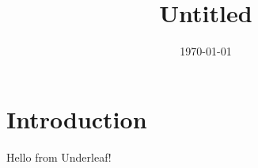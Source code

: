 \documentclass{article}
\title{Untitled}
\author{}
\date{\today}
\begin{document}
\maketitle

\section{Introduction}
Hello from Underleaf!
\end{document}
